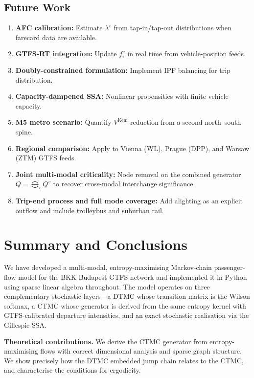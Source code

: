 \documentclass[12pt,a4paper]{article}
\theoremstyle{plain}
\theoremstyle{definition}
\theoremstyle{remark}
\begin{document}
\subsection{Future Work}

\begin{enumerate}
  \item \textbf{AFC calibration:} Estimate $\lambda^v$ from tap-in/tap-out
    distributions when farecard data are available.
  \item \textbf{GTFS-RT integration:} Update $f^v_i$ in real time from
    vehicle-position feeds.
  \item \textbf{Doubly-constrained formulation:} Implement IPF balancing
    for trip distribution.
  \item \textbf{Capacity-dampened SSA:} Nonlinear propensities with finite
    vehicle capacity.
  \item \textbf{M5 metro scenario:} Quantify $V^{\mathrm{Kem}}$ reduction
    from a second north--south spine.
  \item \textbf{Regional comparison:} Apply to Vienna (WL), Prague (DPP),
    and Warsaw (ZTM) GTFS feeds.
  \item \textbf{Joint multi-modal criticality:} Node removal on the combined
    generator $Q=\bigoplus_v Q^v$ to recover cross-modal interchange
    significance.
  \item \textbf{Trip-end process and full mode coverage:} Add alighting as
    an explicit outflow and include trolleybus and suburban rail.
\end{enumerate}

\section{Summary and Conclusions}
\label{sec:conclusion}

We have developed a multi-modal, entropy-maximising Markov-chain
passenger-flow model for the BKK Budapest GTFS network and implemented it in
Python using sparse linear algebra throughout.  The model operates on three
complementary stochastic layers---a DTMC whose transition matrix is the Wilson
softmax, a CTMC whose generator is derived from the same entropy kernel with
GTFS-calibrated departure intensities, and an exact stochastic realisation via
the Gillespie SSA.

\textbf{Theoretical contributions.}  We derive the
CTMC generator from entropy-maximising flows with correct dimensional analysis
and sparse graph structure.  We show precisely how the DTMC embedded jump chain
relates to the CTMC, and characterise the conditions for ergodicity.
\end{document}
